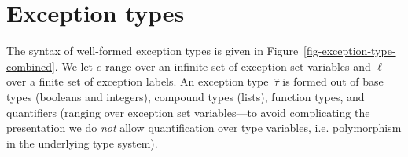 \documentclass{llncs}
\newcommand{\ExnTy}{\widehat\tau}
\newcommand{\ExnVar}{e}
\newcommand{\ExnLbl}{\ell}
\begin{document}
\section{Exception types}\label{section-exception-types}


The syntax of well-formed exception types is given in Figure~\ref{fig-exception-type-combined}.
We let $\ExnVar$ range over an infinite set of exception set variables and $\ExnLbl$ over a finite set of exception labels.
An exception type~$\ExnTy$ is formed out of base types (booleans and integers), compound types (lists), function types, and quantifiers (ranging over exception set variables---to avoid complicating the presentation we do \emph{not} allow quantification over type variables, i.e. polymorphism in the underlying type system).
\end{document}
